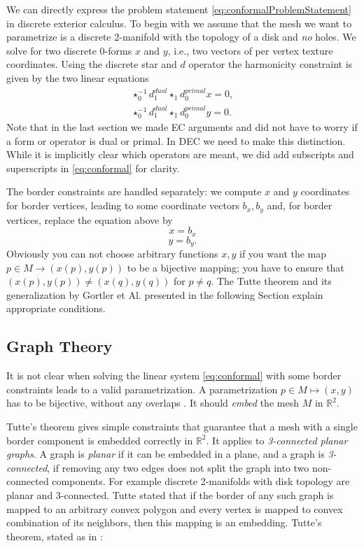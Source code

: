 We can directly express the problem statement \ref{eq:conformalProblemStatement} in discrete exterior calculus. To begin with we assume that the mesh we want to parametrize is a discrete $2$-manifold with the topology of a disk and \emph{no} holes. We solve for two discrete $0$-forms $x$ and $y$, i.e., two vectors of per vertex texture coordinates. Using the discrete star and $d$ operator the harmonicity constraint is given by the two linear equations
\begin{align}\star_0^{-1} d_1^{dual} \star_1 d_0^{primal} x = 0,\nonumber\\
\star_0^{-1} d_1^{dual} \star_1 d_0^{primal} y = 0 \label{eq:conformal}.\end{align}
Note that in the last section we made EC arguments and did not have to worry if a form or operator is dual or primal. In DEC we need to make this distinction. While it is implicitly clear which operators are meant, we did add subscripts and superscripts in \ref{eq:conformal} for clarity.

The border constraints are handled separately: we compute $x$ and $y$ coordinates for border vertices, leading to some coordinate vectors $b_x, b_y$ and, for border vertices, replace the equation above by
\[ x = b_x\]
\[y = b_y.\]
Obviously you can not choose arbitrary functions $x,y$ if you want the map $p\in M \to (x(p),y(p))$ to be a bijective mapping; you have to ensure that $(x(p),y(p)) \neq (x(q),y(q))$ for $p\neq q$. The Tutte theorem and its generalization by Gortler et Al. \cite{Gortler} presented in the following Section explain appropriate conditions.

\subsection{Graph Theory}

It is not clear when solving the linear system \ref{eq:conformal} with some border constraints leads to a valid parametrization. A parametrization $p\in M \mapsto (x,y)$ has to be bijective, without any overlaps . It should \emph{embed} the mesh $M$ in $\mathbb R^2$.

Tutte's theorem gives simple constraints that guarantee that a mesh with a single border component is embedded correctly in $\mathbb R^2$. It applies to \emph{3-connected planar graphs}. A graph is \emph{planar} if it can be embedded in a plane, and a graph is \emph{3-connected}, if removing any two edges does not split the graph into two non-connected components. For example discrete 2-manifolds with disk topology are planar and 3-connected. 
Tutte stated that if the border of any such graph is mapped to an arbitrary convex polygon and every vertex is mapped to convex combination of its neighbors, then this mapping is an embedding. Tutte's theorem, stated as in \cite{Gortler}:

